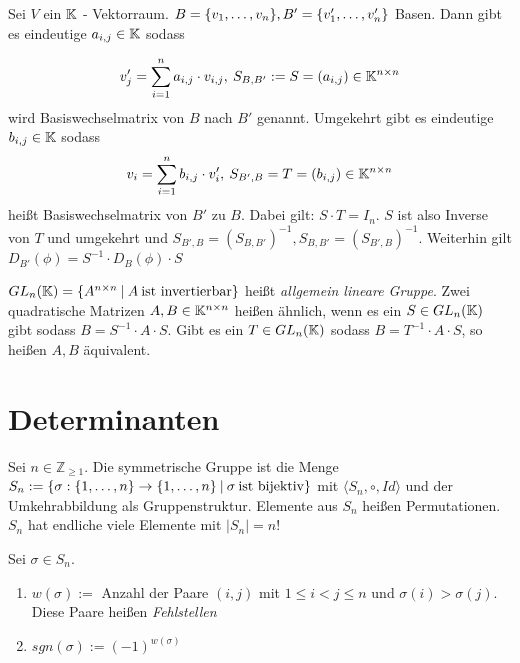 \begin{satz}
	Sei $V$ ein $\mathbb{K}$ - Vektorraum. $B = \{ v_1, \dots, v_n \}, B'=\{v'_1, \dots, v'_n\}$ Basen. Dann gibt es eindeutige $a_{i,j} \in \mathbb{K}$ sodass
	
	\begin{equation*}
		v_j' = \sum_{i=1}^{n} a_{i,j} \cdot v_{i,j}, \medspace S_{B,B'} := S = (a_{i,j}) \in \mathbb{K}^{n \times n}  
	\end{equation*}
	wird Basiswechselmatrix von $B$ nach $B'$ genannt. Umgekehrt gibt es eindeutige $b_{i,j} \in \mathbb{K}$ sodass
	\begin{equation*}
		v_i  = \sum_{i=1}^{n} b_{i,j} \cdot v_i', \medspace S_{B',B} = T = (b_{i,j}) \in \mathbb{K}^{n \times n} 
	\end{equation*}
	heißt Basiswechselmatrix von $B'$ zu $B$. Dabei gilt: $S \cdot T = I_n$. $S$ ist also Inverse von $T$ und umgekehrt und $S_{B', B} = (S_{B,B'})^{-1}, S_{B,B'} = (S_{B',B})^{-1}$. Weiterhin gilt $D_{B'}(\phi) = S^{-1} \cdot D_B(\phi) \cdot S$
\end{satz}

\begin{definition}
	$GL_n(\mathbb{K}) = \{A^{n \times n} \medspace | \medspace A \medspace \textnormal{ist invertierbar}\}$ heißt \emph{allgemein lineare Gruppe}. Zwei quadratische Matrizen $A,B \in \mathbb{K}^{n \times n}$ heißen ähnlich, wenn es ein $S \in GL_n(\mathbb{K})$ gibt sodass $B = S^{-1} \cdot A \cdot S$. Gibt es ein $T \in GL_n(\mathbb{K})$ sodass $B = T^{-1} \cdot A \cdot S$, so heißen $A,B$ äquivalent.
\end{definition}

\section{Determinanten} 

\begin{definition}
	Sei $n \in \mathbb{Z}_{\geq 1}$. Die symmetrische Gruppe ist die Menge $S_n := \{ \sigma : \{ 1, \dots, n \} \rightarrow \{1, \dots, n\} \medspace | \medspace \sigma \medspace \textnormal{ist bijektiv}  \}$ mit $\langle S_n, \circ, Id \rangle$ und der Umkehrabbildung als Gruppenstruktur. Elemente aus $S_n$ heißen Permutationen. $S_n$ hat endliche viele Elemente mit $|S_n| = n!$
\end{definition}

\begin{definition}
	Sei $\sigma \in S_n$.
	\begin{enumerate}[noitemsep]
		\item $w(\sigma) := $ Anzahl der Paare $(i,j)$ mit $1 \leq i < j \leq n$ und $\sigma(i) > \sigma(j)$. Diese Paare heißen \emph{Fehlstellen}
		\item $sgn(\sigma) := (-1)^{w(\sigma)}$
	\end{enumerate}
\end{definition}

